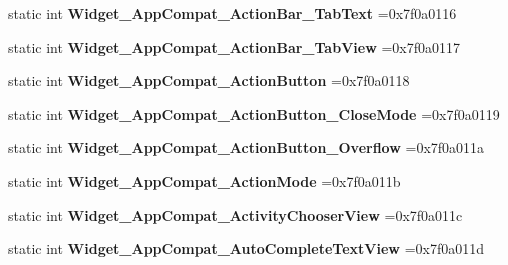 \begin{DoxyCompactItemize}
static int {\bfseries Widget\+\_\+\+App\+Compat\+\_\+\+Action\+Bar\+\_\+\+Tab\+Text} =0x7f0a0116
\item 
\mbox{\label{classandroid_1_1support_1_1v7_1_1appcompat_1_1R_1_1style_a060634f53a954e146ae54e0c3f16ea95}} 
static int {\bfseries Widget\+\_\+\+App\+Compat\+\_\+\+Action\+Bar\+\_\+\+Tab\+View} =0x7f0a0117
\item 
\mbox{\label{classandroid_1_1support_1_1v7_1_1appcompat_1_1R_1_1style_a81bf83704bea18e08496ab9e7440924c}} 
static int {\bfseries Widget\+\_\+\+App\+Compat\+\_\+\+Action\+Button} =0x7f0a0118
\item 
\mbox{\label{classandroid_1_1support_1_1v7_1_1appcompat_1_1R_1_1style_a9336ac2c50b48571c84043ef31a86856}} 
static int {\bfseries Widget\+\_\+\+App\+Compat\+\_\+\+Action\+Button\+\_\+\+Close\+Mode} =0x7f0a0119
\item 
\mbox{\label{classandroid_1_1support_1_1v7_1_1appcompat_1_1R_1_1style_a211196e780676a0ddcc7617ec9206b44}} 
static int {\bfseries Widget\+\_\+\+App\+Compat\+\_\+\+Action\+Button\+\_\+\+Overflow} =0x7f0a011a
\item 
\mbox{\label{classandroid_1_1support_1_1v7_1_1appcompat_1_1R_1_1style_ad54a97d09f7b5343f029339d704cf177}} 
static int {\bfseries Widget\+\_\+\+App\+Compat\+\_\+\+Action\+Mode} =0x7f0a011b
\item 
\mbox{\label{classandroid_1_1support_1_1v7_1_1appcompat_1_1R_1_1style_ae4e5f9995d44cbbad70b8a381f7dcca7}} 
static int {\bfseries Widget\+\_\+\+App\+Compat\+\_\+\+Activity\+Chooser\+View} =0x7f0a011c
\item 
\mbox{\label{classandroid_1_1support_1_1v7_1_1appcompat_1_1R_1_1style_a5157d1c6b2de5c7394fb58d0dfa69d21}} 
static int {\bfseries Widget\+\_\+\+App\+Compat\+\_\+\+Auto\+Complete\+Text\+View} =0x7f0a011d
\item 
\mbox{\label{classandroid_1_1support_1_1v7_1_1appcompat_1_1R_1_1style_a188c942e210b6c5b5043171c9a5ccd1b}} 

\end{DoxyCompactItemize}
